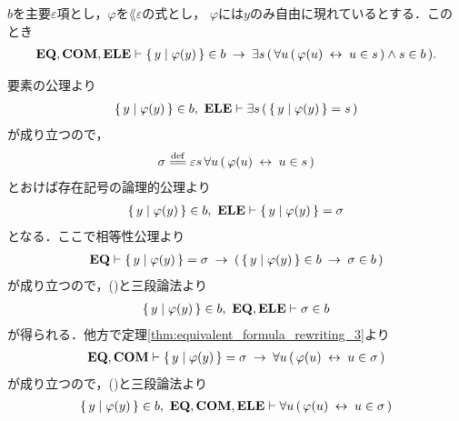 	\begin{screen}
		\begin{thm}
		\label{thm:equivalent_formula_rewriting_9}
			$b$を主要$\varepsilon$項とし，$\varphi$を$\lang{\varepsilon}$の式とし，
			$\varphi$には$y$のみ自由に現れているとする．このとき
			\begin{align}
				\mbox{{\bf EQ}},\mbox{\bf COM},\mbox{{\bf ELE}} \vdash \{\, y \mid \varphi(y)\, \} \in b
				\hspace{0.25em}\rightarrow\hspace{0.25em} \exists s\, (\, 
				\forall u\, (\, \varphi(u) \hspace{0.25em}\leftrightarrow\hspace{0.25em} u \in s\, )
				\wedge s \in b\, ).
			\end{align}
		\end{thm}
	\end{screen}
	
	\begin{sketch}
		要素の公理より
		\begin{align}
			\{\, y \mid \varphi(y)\, \} \in b,\ \mbox{{\bf ELE}} \vdash 
			\exists s\, (\, \{\, y \mid \varphi(y)\, \} = s\, )
		\end{align}
		が成り立つので，
		\begin{align}
			\sigma \defeq 
			\varepsilon s\, \forall u\, (\, \varphi(u) \lrarrow u \in s\, )
		\end{align}
		とおけば存在記号の論理的公理より
		\begin{align}
			\{\, y \mid \varphi(y)\, \} \in b,\ \mbox{{\bf ELE}} \vdash \{\, y \mid \varphi(y)\, \} = \sigma
			\label{fom:equivalent_formula_rewriting_9_1}
		\end{align}
		となる．ここで相等性公理より
		\begin{align}
			\mbox{{\bf EQ}} \vdash \{\, y \mid \varphi(y)\, \} = \sigma
			\hspace{0.25em}\rightarrow\hspace{0.25em} (\, \{\, y \mid \varphi(y)\, \} \in b \hspace{0.25em}\rightarrow\hspace{0.25em} \sigma \in b\, )
		\end{align}
		が成り立つので，()と三段論法より
		\begin{align}
			\{\, y \mid \varphi(y)\, \} \in b,\ \mbox{{\bf EQ}},\mbox{{\bf ELE}} \vdash \sigma \in b
			\label{fom:equivalent_formula_rewriting_9_2}
		\end{align}
		が得られる．他方で定理\ref{thm:equivalent_formula_rewriting_3}より
		\begin{align}
			\mbox{{\bf EQ}},\mbox{\bf COM} \vdash \{\, y \mid \varphi(y)\, \} = \sigma
			\hspace{0.25em}\rightarrow\hspace{0.25em} \forall u\, (\, \varphi(u) \hspace{0.25em}\leftrightarrow\hspace{0.25em} u \in \sigma\, )
		\end{align}
		が成り立つので，()と三段論法より
		\begin{align}
			\Set{y}{\varphi(y)} \in b,\ \EQAX,\COMAX,\ELEAX \vdash
			\forall u\, (\, \varphi(u) \lrarrow u \in \sigma\, )
			\label{fom:equivalent_formula_rewriting_9_3}

\end{align}
\end{sketch}
